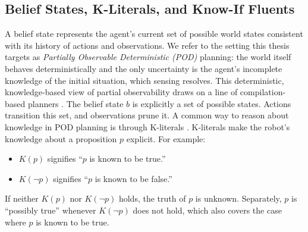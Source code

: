 \subsection{Belief States, K-Literals, and Know-If Fluents}
A belief state represents the agent's current set of possible world states consistent with its history of actions and observations. We refer to the setting this thesis targets as \emph{Partially Observable Deterministic (POD)} planning: the world itself behaves deterministically and the only uncertainty is the agent's incomplete knowledge of the initial situation, which sensing resolves. This deterministic, knowledge-based view of partial observability draws on a line of compilation-based planners \cite{bonet2014flexible, albore2009translation, geffner2013concise}. The belief state $b$ is explicitly a set of possible states. Actions transition this set, and observations prune it.
A common way to reason about knowledge in POD planning is through K-literals \cite{bonet2011planning, geffner2013concise}. K-literals make the robot's knowledge about a proposition $p$ explicit. For example:
\begin{itemize}
    \item $K(p)$ signifies ``$p$ is known to be true.''
    \item $K(\neg p)$ signifies ``$p$ is known to be false.''
\end{itemize}
If neither $K(p)$ nor $K(\neg p)$ holds, the truth of $p$ is unknown. Separately, $p$ is ``possibly true'' whenever $K(\neg p)$ does not hold, which also covers the case where $p$ is known to be true.

